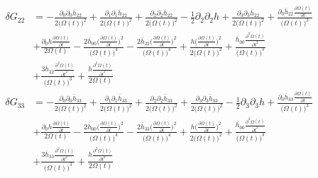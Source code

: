 \documentclass[10pt,letterpaper]{article}
\begin{document}
\begin{align}
	\delta G_{22} &=- \frac{\partial_{0}\partial_{0}\overline{h}_{22}}{2 \bigl(\Omega(t)\bigr)^2} + \frac{\partial_{1}\partial_{1}\overline{h}_{22}}{2 \bigl(\Omega(t)\bigr)^2} + \frac{\partial_{2}\partial_{2}\overline{h}_{22}}{2 \bigl(\Omega(t)\bigr)^2} -  \tfrac{1}{2} \partial_{2}\partial_{2}h + \frac{\partial_{3}\partial_{3}\overline{h}_{22}}{2 \bigl(\Omega(t)\bigr)^2} + \frac{\partial_{0}\overline{h}_{22} \frac{\partial \Omega(t)}{\partial t}}{\bigl(\Omega(t)\bigr)^3}\\
& + \frac{\partial_{0}h \frac{\partial \Omega(t)}{\partial t}}{2 \Omega(t)} -  \frac{2 \overline{h}_{00} \bigl(\frac{\partial \Omega(t)}{\partial t}\bigr)^2}{\bigl(\Omega(t)\bigr)^4} -  \frac{2 \overline{h}_{22} \bigl(\frac{\partial \Omega(t)}{\partial t}\bigr)^2}{\bigl(\Omega(t)\bigr)^4} + \frac{h \bigl(\frac{\partial \Omega(t)}{\partial t}\bigr)^2}{2 \bigl(\Omega(t)\bigr)^2} + \frac{\overline{h}_{00} \frac{\partial^{2}\Omega(t)}{\partial t^{2}}}{\bigl(\Omega(t)\bigr)^3} \\
&+ \frac{3 \overline{h}_{22} \frac{\partial^{2}\Omega(t)}{\partial t^{2}}}{\bigl(\Omega(t)\bigr)^3} + \frac{h \frac{\partial^{2}\Omega(t)}{\partial t^{2}}}{2 \Omega(t)}
\end{align}
\begin{align}
	\delta G_{33} &= - \frac{\partial_{0}\partial_{0}\overline{h}_{33}}{2 \bigl(\Omega(t)\bigr)^2} + \frac{\partial_{1}\partial_{1}\overline{h}_{33}}{2 \bigl(\Omega(t)\bigr)^2} + \frac{\partial_{2}\partial_{2}\overline{h}_{33}}{2 \bigl(\Omega(t)\bigr)^2} + \frac{\partial_{3}\partial_{3}\overline{h}_{33}}{2 \bigl(\Omega(t)\bigr)^2} -  \tfrac{1}{2} \partial_{3}\partial_{3}h + \frac{\partial_{0}\overline{h}_{33} \frac{\partial \Omega(t)}{\partial t}}{\bigl(\Omega(t)\bigr)^3}\\
& + \frac{\partial_{0}h \frac{\partial \Omega(t)}{\partial t}}{2 \Omega(t)} -  \frac{2 \overline{h}_{00} \bigl(\frac{\partial \Omega(t)}{\partial t}\bigr)^2}{\bigl(\Omega(t)\bigr)^4} -  \frac{2 \overline{h}_{33} \bigl(\frac{\partial \Omega(t)}{\partial t}\bigr)^2}{\bigl(\Omega(t)\bigr)^4} + \frac{h \bigl(\frac{\partial \Omega(t)}{\partial t}\bigr)^2}{2 \bigl(\Omega(t)\bigr)^2} + \frac{\overline{h}_{00} \frac{\partial^{2}\Omega(t)}{\partial t^{2}}}{\bigl(\Omega(t)\bigr)^3}\\
& + \frac{3 \overline{h}_{33} \frac{\partial^{2}\Omega(t)}{\partial t^{2}}}{\bigl(\Omega(t)\bigr)^3} + \frac{h \frac{\partial^{2}\Omega(t)}{\partial t^{2}}}{2 \Omega(t)}
\end{align}
\end{document}
